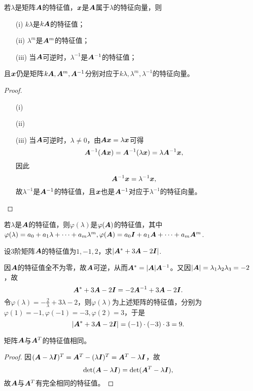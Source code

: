 \begin{xingzhi}
  若$\lambda$是矩阵$\A$的特征值，$\xx$是$\A$属于$\lambda$的特征向量，则
  \begin{itemize}
  \item[(i)] $k\lambda$是$k\A$的特征值；
  \item[(ii)] $\lambda^m$是$\A^m$的特征值；
  \item[(iii)] 当$\A$可逆时，$\lambda^{-1}$是$\A^{-1}$的特征值；
  \end{itemize}
  且$\xx$仍是矩阵$k\A,\A^m,\A^{-1}$分别对应于$k\lambda,\lambda^m,\lambda^{-1}$的特征向量。
\end{xingzhi}
\begin{proof}
  \begin{itemize}
  \item[(i)]
  \item[(ii)]
  \item[(iii)] 当$\A$可逆时，$\lambda\ne0$，由$\A\xx=\lambda\xx$可得
    $$
    \A^{-1}(\A\xx)=\A^{-1}(\lambda\xx)=\lambda\A^{-1}\xx,
    $$
    因此
    $$
    \A^{-1}\xx=\lambda^{-1}\xx,
    $$
    故$\lambda^{-1}$是$\A^{-1}$的特征值，且$\xx$也是$\A^{-1}$对应于$\lambda^{-1}$的特征向量。
  \end{itemize}
\end{proof}

\begin{zhu*}
  若$\lambda$是$\A$的特征值，则$\varphi(\lambda)$是$\varphi(\A)$的特征值，其中$\varphi(\lambda)=a_0+a_1\lambda+\cd+a_m\lambda^m, \varphi(\A)=a_0\II+a_1\A+\cd+a_m\A^m$.
\end{zhu*}

\begin{li}
  设$3$阶矩阵$\A$的特征值为$1,-1,2$，求$|\A^*+3\A-2\II|$.
\end{li}
\begin{jie}
  因$\A$的特征值全不为零，故$\A$可逆，从而$\A^*=|\A|\A^{-1}$。又因$|\A|=\lambda_1\lambda_2\lambda_3=-2$，故
  $$
  \A^*+3\A-2\II=-2\A^{-1}+3\A-2\II.
  $$
  令$\varphi(\lambda)=-\frac2\lambda+3\lambda-2$，则$\varphi(\lambda)$为上述矩阵的特征值，分别为$\varphi(1)=-1,\varphi(-1)=-3,\varphi(2)=3$，于是
  $$
  |\A^*+3\A-2\II|=(-1)\cdot(-3)\cdot3=9.
  $$
\end{jie}

\begin{xingzhi}
  矩阵$\A$与$\A^T$的特征值相同。
\end{xingzhi}
\begin{proof}
  因$(\A-\lambda\II)^T=\A^T-(\lambda\II)^T=\A^T-\lambda\II$，故
  $$
  \det(\A-\lambda\II)=\det(\A^T-\lambda\II),
  $$
  故$\A$与$\A^T$有完全相同的特征值。
\end{proof}




